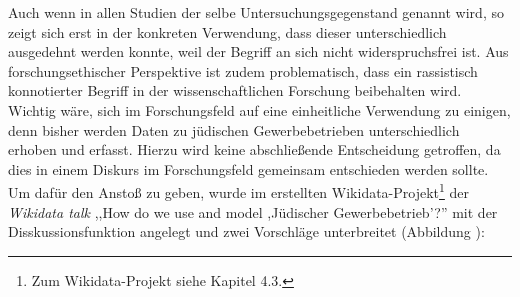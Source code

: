 Auch wenn in allen Studien der selbe Untersuchungsgegenstand genannt wird, so zeigt sich erst in der konkreten Verwendung, dass dieser unterschiedlich ausgedehnt werden konnte, weil der Begriff an sich nicht widerspruchsfrei ist. Aus forschungsethischer Perspektive ist zudem problematisch, dass ein rassistisch konnotierter Begriff in der wissenschaftlichen Forschung beibehalten wird. Wichtig wäre, sich im Forschungsfeld auf eine einheitliche Verwendung zu einigen, denn bisher werden Daten zu jüdischen Gewerbebetrieben unterschiedlich erhoben und erfasst. Hierzu wird keine abschließende Entscheidung getroffen, da dies in einem Diskurs im Forschungsfeld gemeinsam entschieden werden sollte. Um dafür den Anstoß zu geben, wurde im erstellten Wikidata-Projekt\footnote{Zum Wikidata-Projekt siehe Kapitel 4.3.} der \textit{Wikidata talk} ,,How do we use and model ,Jüdischer Gewerbebetrieb'?'' mit der Disskussionsfunktion angelegt und zwei Vorschläge unterbreitet (Abbildung ): 

